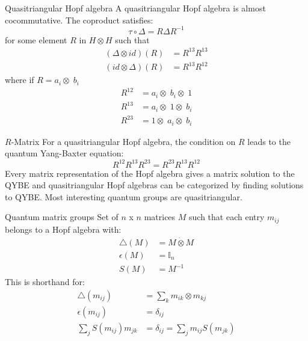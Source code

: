 \documentclass[pdf,colorBG,slideColor,fyma]{prosper}
\def\I1{\mathbb{I}}
\begin{document}
\begin{slide}{Quasitriangular Hopf algebra}
A quasitriangular Hopf algebra is almost cocommutative. The coproduct satisfies:
\[
\tau \circ \Delta = R \Delta R^{-1}
\]
for some element $R$ in $H \otimes H$ such that
\begin{align*}
(\Delta \otimes id)(R) & = R^{13} R^{13} \\
(id \otimes \Delta)(R) & = R^{13} R^{12}
\end{align*}
where if $R = a_{i} \otimes\; b_{i}$
\begin{align*}
R^{12} & = a_{i} \otimes\; b_{i} \otimes\; 1 \\
R^{13} & = a_{i} \otimes\; 1 \otimes\; b_{i} \\
R^{23} & = 1 \otimes\; a_{i} \otimes\; b_{i}
\end{align*}

\end{slide}

\begin{slide}{$R$-Matrix}
For a quasitriangular Hopf algebra, the condition on $R$ leads to the
quantum Yang-Baxter equation:
\[
R^{12} R^{13} R^{23} = R^{23} R^{13} R^{12}
\]
Every matrix representation of the Hopf algebra gives a matrix solution to the
QYBE and quasitriangular Hopf algebras can be categorized by finding solutions to QYBE.
\break
\break
Most interesting quantum groups are quasitriangular.
\end{slide}


\begin{slide}{Quantum matrix groups}
Set of $n$ x $n$ matrices $M$ such that each entry $m_{ij}$ belongs to a Hopf algebra with:
\begin{align*}
\triangle(M) &= M \dot{\otimes} M \\
\epsilon(M) &= \I1_n \\
S(M) &= M^{-1}
\end{align*}
This is shorthand for:
\begin{align*}
\triangle(m_{ij}) &= \sum_k m_{ik} \otimes m_{kj} \\
\epsilon(m_{ij}) &= \delta_{ij} \\
\sum_j S(m_{ij}) m_{jk} &= \delta_{ij} = \sum_j m_{ij} S(m_{jk})
\end{align*}
\end{slide}

\end{document}
